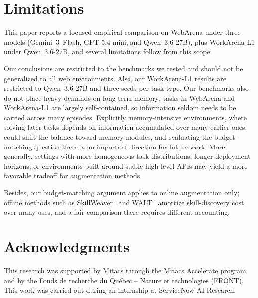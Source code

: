 \section{Limitations}

This paper reports a focused empirical comparison on WebArena under three models (Gemini~3~Flash, GPT-5.4-mini, and Qwen~3.6-27B), plus WorkArena-L1 under Qwen~3.6-27B, and several limitations follow from this scope.

Our conclusions are restricted to the benchmarks we tested and should not be generalized to all web environments.
Also, our WorkArena-L1 results are restricted to Qwen~3.6-27B and three seeds per task type.
Our benchmarks also do not place heavy demands on long-term memory: tasks in WebArena and WorkArena-L1 are largely self-contained, so information seldom needs to be carried across many episodes.
Explicitly memory-intensive environments, where solving later tasks depends on information accumulated over many earlier ones, could shift the balance toward memory modules, and evaluating the budget-matching question there is an important direction for future work.
More generally, settings with more homogeneous task distributions, longer deployment horizons, or environments built around stable high-level APIs may yield a more favorable tradeoff for augmentation methods.

Besides, our budget-matching argument applies to online augmentation only; offline methods such as SkillWeaver~\citep{zheng-etal-2025-skillweaver} and WALT~\citep{prabhu-etal-2025-walt} amortize skill-discovery cost over many uses, and a fair comparison there requires different accounting.


\section*{Acknowledgments}

This research was supported by Mitacs through the Mitacs Accelerate program and by the Fonds de recherche du Québec -- Nature et technologies (FRQNT).
This work was carried out during an internship at ServiceNow AI Research.
